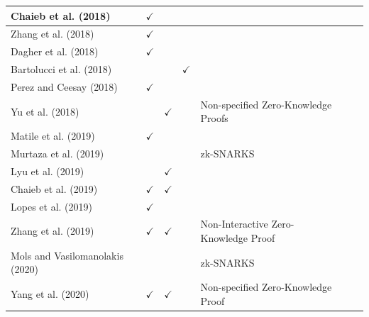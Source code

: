 \documentclass[../access.tex]{subfiles}
\begin{document}
\begin{table}[htbp]
\begin{adjustwidth}{-2cm}{}
\begin{tabular}{m{4.4cm} c >{\centering\arraybackslash}m{1.7cm} c >{\centering\arraybackslash}m{6cm} >{\centering\arraybackslash} m{1.0cm} >{\centering\arraybackslash}m{14.9cm}}
                    \hline
                    \footnotesize{Chaieb et al. (2018) \cite{Chaieb2018}} & $ \checkmark $ & {} & {} & {} \\
                    \hline
                    \footnotesize{Zhang et al. (2018) \cite{Zhang2018}} & $ \checkmark $ & {} & {} & {} \\
                    \hline
                    \footnotesize{Dagher et al. (2018) \cite{Dagher2018}} & $ \checkmark $ & {} & {} & {} \\
                    \hline
                    \footnotesize{Bartolucci et al. (2018) \cite{Bartolucci2018}} & {} & {} & $ \checkmark $ & {} \\
                    \hline
                    \footnotesize{Perez and Ceesay (2018) \cite{Perez2018}} & $ \checkmark $ & {} & {} & {} \\
                    \hline
                    \footnotesize{Yu et al. (2018) \cite{Yu2018}} & {} & $ \checkmark $ & {} & \footnotesize{Non-specified Zero-Knowledge Proofs} \\
                    \hline
                    \footnotesize{Matile et al. (2019) \cite{Matile2019}} & $ \checkmark $ & {} & {} & {} \\
                    \hline
                    \footnotesize{Murtaza et al. (2019) \cite{Murtaza2019}} & {} & {} & {} & \footnotesize{zk-SNARKS} \\
                    \hline
                    \footnotesize{Lyu et al. (2019) \cite{Lyu2019}} & {} & $ \checkmark $ & {} & {} \\
                    \hline
                    \footnotesize{Chaieb et al. (2019) \cite{Chaieb2019}} & $ \checkmark $ & $ \checkmark $ & {} & {} \\
                    \hline
                    \footnotesize{Lopes et al. (2019) \cite{Lopes2019}} & $ \checkmark $ & {} & {} & {} \\
                    \hline
                    \footnotesize{Zhang et al. (2019) \cite{Zhang2019a}} & $ \checkmark $ & $ \checkmark $ & {} & \footnotesize{Non-Interactive Zero-Knowledge Proof} \\
                    \hline
                    \footnotesize{Mols and Vasilomanolakis (2020) \cite{Mols2020}} & {} & {} & {} & \footnotesize{zk-SNARKS} \\
                    \hline
                    \footnotesize{Yang et al. (2020) \cite{Yang2020}} & $ \checkmark $ & $ \checkmark $ & {} & \footnotesize{Non-specified Zero-Knowledge Proof} \\

\end{tabular}
\end{adjustwidth}
\end{table}
\end{document}
